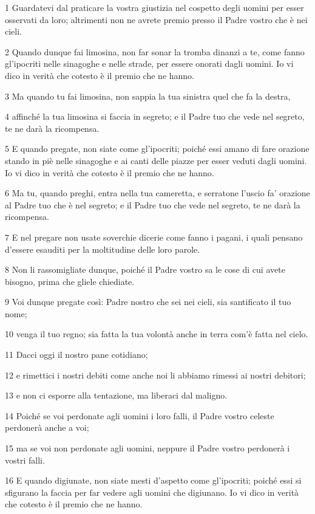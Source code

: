 \par 1 Guardatevi dal praticare la vostra giustizia nel cospetto degli uomini per esser osservati da loro; altrimenti non ne avrete premio presso il Padre vostro che è nei cieli.
\par 2 Quando dunque fai limosina, non far sonar la tromba dinanzi a te, come fanno gl'ipocriti nelle sinagoghe e nelle strade, per essere onorati dagli uomini. Io vi dico in verità che cotesto è il premio che ne hanno.
\par 3 Ma quando tu fai limosina, non sappia la tua sinistra quel che fa la destra,
\par 4 affinché la tua limosina si faccia in segreto; e il Padre tuo che vede nel segreto, te ne darà la ricompensa.
\par 5 E quando pregate, non siate come gl'ipocriti; poiché essi amano di fare orazione stando in piè nelle sinagoghe e ai canti delle piazze per esser veduti dagli uomini. Io vi dico in verità che cotesto è il premio che ne hanno.
\par 6 Ma tu, quando preghi, entra nella tua cameretta, e serratone l'uscio fa' orazione al Padre tuo che è nel segreto; e il Padre tuo che vede nel segreto, te ne darà la ricompensa.
\par 7 E nel pregare non usate soverchie dicerie come fanno i pagani, i quali pensano d'essere esauditi per la moltitudine delle loro parole.
\par 8 Non li rassomigliate dunque, poiché il Padre vostro sa le cose di cui avete bisogno, prima che gliele chiediate.
\par 9 Voi dunque pregate così: Padre nostro che sei nei cieli, sia santificato il tuo nome;
\par 10 venga il tuo regno; sia fatta la tua volontà anche in terra com'è fatta nel cielo.
\par 11 Dacci oggi il nostro pane cotidiano;
\par 12 e rimettici i nostri debiti come anche noi li abbiamo rimessi ai nostri debitori;
\par 13 e non ci esporre alla tentazione, ma liberaci dal maligno.
\par 14 Poiché se voi perdonate agli uomini i loro falli, il Padre vostro celeste perdonerà anche a voi;
\par 15 ma se voi non perdonate agli uomini, neppure il Padre vostro perdonerà i vostri falli.
\par 16 E quando digiunate, non siate mesti d'aspetto come gl'ipocriti; poiché essi si sfigurano la faccia per far vedere agli uomini che digiunano. Io vi dico in verità che cotesto è il premio che ne hanno.
